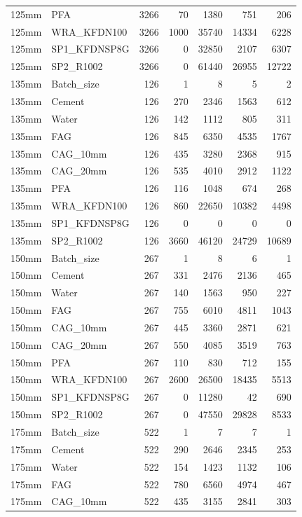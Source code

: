 \documentclass[
]{article}
\begin{document}
\begin{longtable}[]{@{}llrrrrr@{}}
125mm & PFA & 3266 & 70 & 1380 & 751 & 206 \\
125mm & WRA\_KFDN100 & 3266 & 1000 & 35740 & 14334 & 6228 \\
125mm & SP1\_KFDNSP8G & 3266 & 0 & 32850 & 2107 & 6307 \\
125mm & SP2\_R1002 & 3266 & 0 & 61440 & 26955 & 12722 \\
135mm & Batch\_size & 126 & 1 & 8 & 5 & 2 \\
135mm & Cement & 126 & 270 & 2346 & 1563 & 612 \\
135mm & Water & 126 & 142 & 1112 & 805 & 311 \\
135mm & FAG & 126 & 845 & 6350 & 4535 & 1767 \\
135mm & CAG\_10mm & 126 & 435 & 3280 & 2368 & 915 \\
135mm & CAG\_20mm & 126 & 535 & 4010 & 2912 & 1122 \\
135mm & PFA & 126 & 116 & 1048 & 674 & 268 \\
135mm & WRA\_KFDN100 & 126 & 860 & 22650 & 10382 & 4498 \\
135mm & SP1\_KFDNSP8G & 126 & 0 & 0 & 0 & 0 \\
135mm & SP2\_R1002 & 126 & 3660 & 46120 & 24729 & 10689 \\
150mm & Batch\_size & 267 & 1 & 8 & 6 & 1 \\
150mm & Cement & 267 & 331 & 2476 & 2136 & 465 \\
150mm & Water & 267 & 140 & 1563 & 950 & 227 \\
150mm & FAG & 267 & 755 & 6010 & 4811 & 1043 \\
150mm & CAG\_10mm & 267 & 445 & 3360 & 2871 & 621 \\
150mm & CAG\_20mm & 267 & 550 & 4085 & 3519 & 763 \\
150mm & PFA & 267 & 110 & 830 & 712 & 155 \\
150mm & WRA\_KFDN100 & 267 & 2600 & 26500 & 18435 & 5513 \\
150mm & SP1\_KFDNSP8G & 267 & 0 & 11280 & 42 & 690 \\
150mm & SP2\_R1002 & 267 & 0 & 47550 & 29828 & 8533 \\
175mm & Batch\_size & 522 & 1 & 7 & 7 & 1 \\
175mm & Cement & 522 & 290 & 2646 & 2345 & 253 \\
175mm & Water & 522 & 154 & 1423 & 1132 & 106 \\
175mm & FAG & 522 & 780 & 6560 & 4974 & 467 \\
175mm & CAG\_10mm & 522 & 435 & 3155 & 2841 & 303 \\

\end{longtable}
\end{document}
